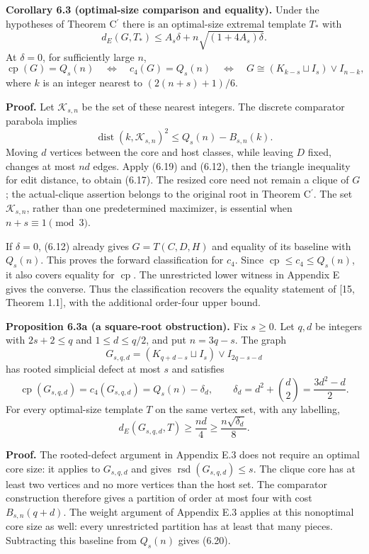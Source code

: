 \documentclass[english,11pt,a4paper]{article}
\begin{document}

\textbf{Corollary 6.3 (optimal-size comparison and equality).} Under the hypotheses of Theorem \texorpdfstring{C\ensuremath{^{\prime}}}{C'} there is an optimal-size extremal template \(T_*\) with \[
d_E(G,T_*)\le A_s\delta+n\sqrt{(1+4A_s)\delta}.
\tag{6.17}
\] At \(\delta=0\), for sufficiently large \(n\), \[
\operatorname{cp}(G)=Q_s(n)
\quad\Longleftrightarrow\quad c_4(G)=Q_s(n)
\quad\Longleftrightarrow\quad
G\cong(K_{k-s}\sqcup I_s)\vee I_{n-k},
\tag{6.18}
\] where \(k\) is an integer nearest to \((2(n+s)+1)/6\).

\textbf{Proof.} Let \(\mathcal K_{s,n}\) be the set of these nearest integers. The discrete comparator parabola implies \[
\operatorname{dist}(k,\mathcal K_{s,n})^2
\le Q_s(n)-B_{s,n}(k).
\tag{6.19}
\] Moving \(d\) vertices between the core and host classes, while leaving \(D\) fixed, changes at most \(nd\) edges. Apply (6.19) and (6.12), then the triangle inequality for edit distance, to obtain (6.17). The resized core need not remain a clique of \(G\); the actual-clique assertion belongs to the original root in Theorem \texorpdfstring{C\ensuremath{^{\prime}}}{C'}. The set \(\mathcal K_{s,n}\), rather than one predetermined maximizer, is essential when \(n+s\equiv1\pmod3\).

If \(\delta=0\), (6.12) already gives \(G=T(C,D,H)\) and equality of its baseline with \(Q_s(n)\). This proves the forward classification for \(c_4\). Since \(\operatorname{cp}\le c_4\le Q_s(n)\), it also covers equality for \(\operatorname{cp}\). The unrestricted lower witness in Appendix E gives the converse. Thus the classification recovers the equality statement of {[}15, Theorem 1.1{]}, with the additional order-four upper bound.


\textbf{Proposition 6.3a (a square-root obstruction).} Fix \(s\ge0\). Let \(q,d\) be integers with \(2s+2\le q\) and \(1\le d\le q/2\), and put \(n=3q-s\). The graph \[
G_{s,q,d}=(K_{q+d-s}\sqcup I_s)\vee I_{2q-s-d}
\] has rooted simplicial defect at most \(s\) and satisfies \[
\operatorname{cp}(G_{s,q,d})=c_4(G_{s,q,d})
=Q_s(n)-\delta_d,\qquad
\delta_d=d^2+\binom d2=\frac{3d^2-d}{2}.
\tag{6.20}
\] For every optimal-size template \(T\) on the same vertex set, with any labelling, \[
d_E(G_{s,q,d},T)\ge\frac{nd}{4}
\ge\frac{n\sqrt{\delta_d}}8.
\tag{6.21}
\]

\textbf{Proof.} The rooted-defect argument in Appendix E.3 does not require an optimal core size: it applies to \(G_{s,q,d}\) and gives \(\operatorname{rsd}(G_{s,q,d})\le s\). The clique core has at least two vertices and no more vertices than the host set. The comparator construction therefore gives a partition of order at most four with cost \(B_{s,n}(q+d)\). The weight argument of Appendix E.3 applies at this nonoptimal core size as well: every unrestricted partition has at least that many pieces. Subtracting this baseline from \(Q_s(n)\) gives (6.20).
\end{document}
